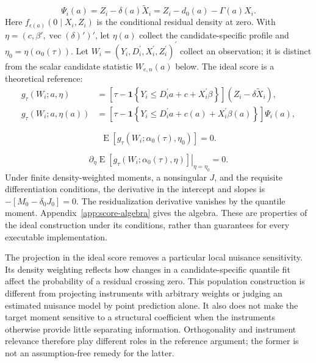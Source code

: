\begin{equation}
    \Psi_i(a)
    =Z_i-\delta(a)\widetilde X_i
    =Z_i-d_0(a)-\Gamma(a)X_i.
    \label{eq:profile-residualized-instrument}
\end{equation}
Here $f_{\epsilon(a)}(0\mid X_i,Z_i)$ is the conditional residual density at zero. With $\eta=(c,\beta',\operatorname{vec}(\delta)')'$, let $\eta(a)$ collect the candidate-specific profile and $\eta_0=\eta(\alpha_0(\tau))$. Let $W_i=(Y_i,D_i^{\prime},X_i^{\prime},Z_i^{\prime})^{\prime}$ collect an observation; it is distinct from the scalar candidate statistic $W_{e,n}(a)$ below. The ideal score is a theoretical reference:
\begin{equation}
    \begin{aligned}
        g_{\tau}(W_i;a,\eta)
        &=
        \left[
            \tau-\mathbf{1}\!\left\{
                Y_i\leq D_i^{\prime}a+c+X_i^{\prime}\beta
            \right\}
        \right]
        \left(Z_i-\delta\widetilde X_i\right),\\
        g_{\tau}(W_i;a,\eta(a))
        &=
        \left[
            \tau-\mathbf{1}\!\left\{
                Y_i\leq D_i^{\prime}a+c(a)+X_i^{\prime}\beta(a)
            \right\}
        \right]\Psi_i(a),
    \end{aligned}
    \label{eq:orthogonal-score}
\end{equation}

\begin{equation}
    \operatorname{E}\!\left[
        g_{\tau}\!\left(W_i;\alpha_0(\tau),\eta_0\right)
    \right]
    =0.
    \label{eq:orthogonal-score-moment}
\end{equation}

\begin{equation}
    \left.
    \partial_{\eta}
    \operatorname{E}\!\left[
        g_{\tau}\!\left(W_i;\alpha_0(\tau),\eta\right)
    \right]
    \right|_{\eta=\eta_0}
    =0.
    \label{eq:neyman-orthogonality}
\end{equation}
Under finite density-weighted moments, a nonsingular $J$, and the requisite differentiation conditions, the derivative in the intercept and slopes is $-[M_0-\delta_0J_0]=0$. The residualization derivative vanishes by the quantile moment. Appendix~\ref{app:score-algebra} gives the algebra. These are properties of the ideal construction under its conditions, rather than guarantees for every executable implementation.

The projection in the ideal score removes a particular local nuisance sensitivity. Its density weighting reflects how changes in a candidate-specific quantile fit affect the probability of a residual crossing zero. This population construction is different from projecting instruments with arbitrary weights or judging an estimated nuisance model by point prediction alone. It also does not make the target moment sensitive to a structural coefficient when the instruments otherwise provide little separating information. Orthogonality and instrument relevance therefore play different roles in the reference argument; the former is not an assumption-free remedy for the latter.

